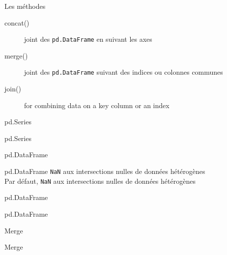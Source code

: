 
\begin{frame}{Les méthodes}
  \begin{description}
    \item[concat()] joint des \texttt{pd.DataFrame} en suivant les axes
    \item[merge()]  joint des \texttt{pd.DataFrame} suivant des indices ou colonnes communes
    \item[join()]   for combining data on a key column or an index
  \end{description}
\end{frame}

\begin{frame}{pd.Series}
\end{frame}

\begin{frame}{pd.Series}
\end{frame}

\begin{frame}{pd.DataFrame}
\end{frame}

\begin{frame}{pd.DataFrame}
  \texttt{NaN} aux intersections nulles de données hétérogènes\\
  Par défaut, \texttt{NaN} aux intersections nulles de données hétérogènes\\
\end{frame}

\begin{frame}{pd.DataFrame}
\end{frame}

\begin{frame}{pd.DataFrame}
\end{frame}


\begin{frame}{Merge}
\end{frame}

\begin{frame}{Merge}
\end{frame}

